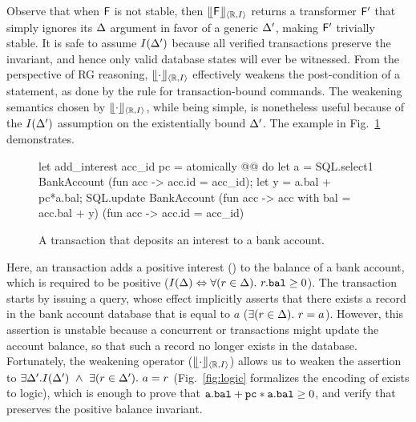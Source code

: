 Observe that when ${\sf F}$ is not stable, then $\llfloor {\sf F} \rrfloor_{\langle \mathbb{R},I \rangle}$ returns a
transformer ${\sf F}'$ that simply ignores its $\Delta$ argument in favor of a generic
$\Delta'$, making ${\sf F}'$ trivially stable. It is safe to assume
$I(\Delta')$ because all verified transactions preserve the invariant,
and hence only valid database states will ever be witnessed. From the
perspective of RG reasoning, $\llfloor \cdot \rrfloor_{\langle \mathbb{R},I \rangle}$ effectively weakens
the post-condition of a statement, as done by the
 rule for transaction-bound commands.  The weakening semantics chosen by
$\llfloor \cdot \rrfloor_{\langle \mathbb{R},I \rangle}$, while being simple, is nonetheless useful because
of the $I(\Delta')$ assumption on the existentially bound $\Delta'$. The
example in Fig.~\ref{fig:weakening-example} demonstrates. 
\begin{figure}[h]
\begin{ocaml}
let add_interest acc_id pc = atomically @@ do
  let a = SQL.select1 BankAccount (fun acc -> acc.id = acc_id);
  let y = a.bal + pc*a.bal;
  SQL.update BankAccount (fun acc -> {acc with bal = acc.bal + y})
                         (fun acc -> acc.id = acc_id)
\end{ocaml}
\caption{A transaction that deposits an interest to a bank account.}
\label{fig:weakening-example}
\end{figure}
Here, an  transaction adds a positive interest
() to the balance of a bank account, which is required to be
positive ($I(\Delta) \Leftrightarrow \forall(r\in\Delta).~r.{\tt bal}\ge
0$). The transaction starts by issuing a  query, whose
effect implicitly asserts that there exists a record in the bank
account database that is equal to $a$
($\exists(r\in\Delta).~r=a$). However, this assertion is unstable
because a concurrent  or  transactions might
update the account balance, so that such a record no longer exists in
the database.  Fortunately, the weakening operator
($\llfloor \cdot \rrfloor_{\langle \mathbb{R},I \rangle}$) allows us to weaken the assertion to $\exists
\Delta'.I(\Delta') ~\wedge~ \exists(r\in\Delta').~a=r$ (Fig.~\ref{fig:logic}
formalizes the encoding of {\sf exists} to logic), which is enough to
prove that ${\tt a.bal + pc*a.bal}\ge 0$, and verify that
 preserves the positive balance invariant.

